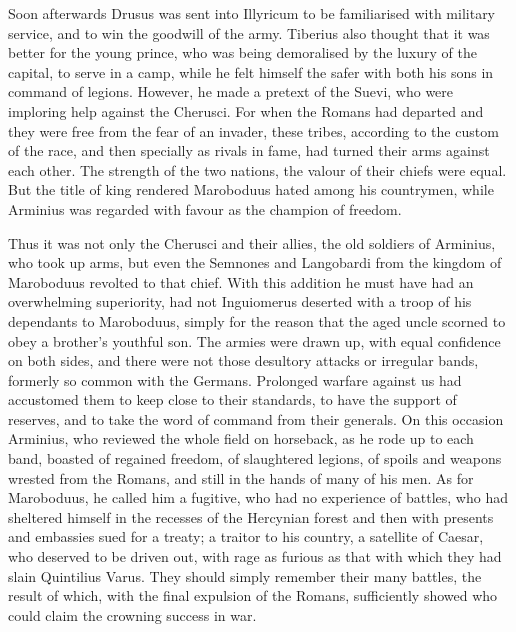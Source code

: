 
Soon afterwards Drusus was sent into Illyricum to be familiarised with military service, and to win the goodwill of the army. Tiberius also thought that it was better for the young prince, who was being demoralised by the luxury of the capital, to serve in a camp, while he felt himself the safer with both his sons in command of legions. However, he made a pretext of the Suevi, who were imploring help against the Cherusci. For when the Romans had departed and they were free from the fear of an invader, these tribes, according to the custom of the race, and then specially as rivals in fame, had turned their arms against each other. The strength of the two nations, the valour of their chiefs were equal. But the title of king rendered Maroboduus hated among his countrymen, while Arminius was regarded with favour as the champion of freedom.


Thus it was not only the Cherusci and their allies, the old soldiers of Arminius, who took up arms, but even the Semnones and Langobardi from the kingdom of Maroboduus revolted to that chief. With this addition he must have had an overwhelming superiority, had not Inguiomerus deserted with a troop of his dependants to Maroboduus, simply for the reason that the aged uncle scorned to obey a brother's youthful son. The armies were drawn up, with equal confidence on both sides, and there were not those desultory attacks or irregular bands, formerly so common with the Germans. Prolonged warfare against us had accustomed them to keep close to their standards, to have the support of reserves, and to take the word of command from their generals. On this occasion Arminius, who reviewed the whole field on horseback, as he rode up to each band, boasted of regained freedom, of slaughtered legions, of spoils and weapons wrested from the Romans, and still in the hands of many of his men. As for Maroboduus, he called him a fugitive, who had no experience of battles, who had sheltered himself in the recesses of the Hercynian forest and then with presents and embassies sued for a treaty; a traitor to his country, a satellite of Caesar, who deserved to be driven out, with rage as furious as that with which they had slain Quintilius Varus. They should simply remember their many battles, the result of which, with the final expulsion of the Romans, sufficiently showed who could claim the crowning success in war.



